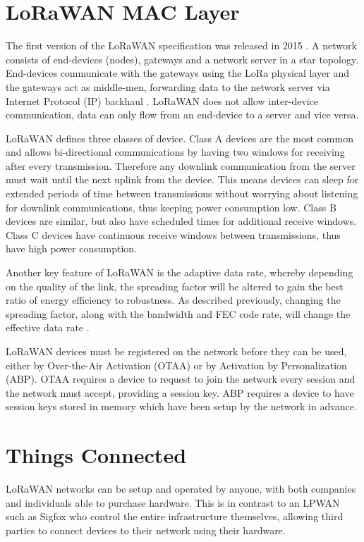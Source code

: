 \documentclass[a4paper]{report}
\begin{document}
  \section{LoRaWAN MAC Layer}
    The first version of the LoRaWAN specification was released in 2015 \cite{LoRaWANSpec}. A network consists of end-devices (nodes), gateways and a network server in a star topology. End-devices communicate with the gateways using the LoRa physical layer and the gateways act as middle-men, forwarding data to the network server via Internet Protocol (IP) backhaul \cite{Augustin2016}. LoRaWAN does not allow inter-device communication, data can only flow from an end-device to a server and vice versa.

    LoRaWAN defines three classes of device. Class A devices are the most common and allows bi-directional communications by having two windows for receiving after every transmission. Therefore any downlink communication from the server must wait until the next uplink from the device. This means devices can sleep for extended periods of time between transmissions without worrying about listening for downlink communications, thus keeping power consumption low. Class B devices are similar, but also have scheduled times for additional receive windows. Class C devices have continuous receive windows between transmissions, thus have high power consumption.

    Another key feature of LoRaWAN is the adaptive data rate, whereby depending on the quality of the link, the spreading factor will be altered to gain the best ratio of energy efficiency to robustness. As described previously, changing the spreading factor, along with the bandwidth and FEC code rate, will change the effective data rate \cite{Vangelista2015}.

    LoRaWAN devices must be registered on the network before they can be used, either by Over-the-Air Activation (OTAA) or by Activation by Personalization (ABP). OTAA requires a device to request to join the network every session and the network must accept, providing a session key. ABP requires a device to have session keys stored in memory which have been setup by the network in advance.

  \section{Things Connected}
    LoRaWAN networks can be setup and operated by anyone, with both companies and individuals able to purchase hardware. This is in contrast to an LPWAN such as Sigfox who control the entire infrastructure themselves, allowing third parties to connect devices to their network using their hardware.
\end{document}
